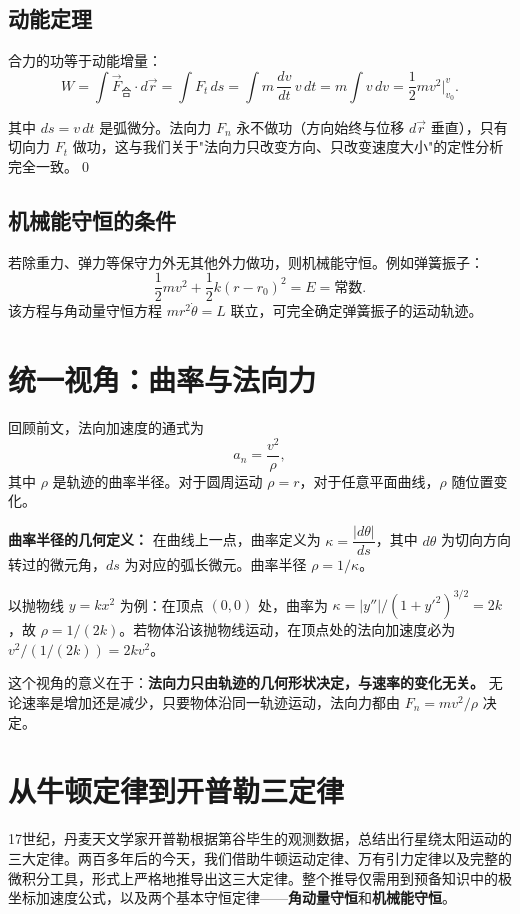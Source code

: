 \documentclass[12pt,a4paper]{article}
\begin{document}
\subsection{动能定理}

合力的功等于动能增量：
\[
W = \int \vec{F}_{\text{合}}\cdot d\vec{r}
  = \int F_t\,ds = \int m\,\frac{dv}{dt}\,v\,dt
  = m\int v\,dv = \frac{1}{2}mv^2\bigg|_{v_0}^{v}.
\]

其中 $ds = v\,dt$ 是弧微分。法向力 $F_n$ 永不做功（方向始终与位移 $d\vec{r}$ 垂直），只有切向力 $F_t$ 做功，这与我们关于"法向力只改变方向、只改变速度大小"的定性分析完全一致。\qed

\subsection{机械能守恒的条件}

若除重力、弹力等保守力外无其他外力做功，则机械能守恒。例如弹簧振子：
\[
\frac{1}{2}mv^2 + \frac{1}{2}k(r-r_0)^2 = E = \text{常数}.
\]
该方程与角动量守恒方程 $mr^2\dot{\theta} = L$ 联立，可完全确定弹簧振子的运动轨迹。

\section{统一视角：曲率与法向力}

回顾前文，法向加速度的通式为
\[
a_n = \frac{v^2}{\rho},
\]
其中 $\rho$ 是轨迹的曲率半径。对于圆周运动 $\rho=r$，对于任意平面曲线，$\rho$ 随位置变化。

\textbf{曲率半径的几何定义：} 在曲线上一点，曲率定义为 $\kappa = \dfrac{|d\theta|}{ds}$，其中 $d\theta$ 为切向方向转过的微元角，$ds$ 为对应的弧长微元。曲率半径 $\rho = 1/\kappa$。

以抛物线 $y = kx^2$ 为例：在顶点 $(0,0)$ 处，曲率为 $\kappa = |y''|/(1+y'^2)^{3/2} = 2k$，故 $\rho = 1/(2k)$。若物体沿该抛物线运动，在顶点处的法向加速度必为 $v^2/(1/(2k)) = 2kv^2$。

这个视角的意义在于：\textbf{法向力只由轨迹的几何形状决定，与速率的变化无关。} 无论速率是增加还是减少，只要物体沿同一轨迹运动，法向力都由 $F_n = mv^2/\rho$ 决定。

\section{从牛顿定律到开普勒三定律}

17世纪，丹麦天文学家开普勒根据第谷毕生的观测数据，总结出行星绕太阳运动的三大定律。两百多年后的今天，我们借助牛顿运动定律、万有引力定律以及完整的微积分工具，形式上严格地推导出这三大定律。整个推导仅需用到预备知识中的极坐标加速度公式，以及两个基本守恒定律——\textbf{角动量守恒}和\textbf{机械能守恒}。
\end{document}
